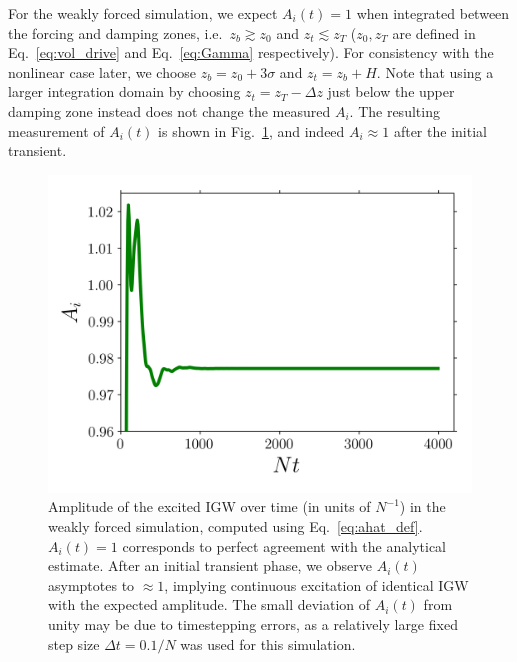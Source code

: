 \documentclass[
        fleqn,
        usenatbib,
    ]{mnras}
\begin{document}
For the weakly forced simulation, we expect
$A_i(t) = 1$ when integrated between the forcing and damping zones, i.e.\
$z_b \gtrsim z_0$ and $z_t \lesssim z_T$ ($z_0, z_T$ are defined in
Eq.~\eqref{eq:vol_drive} and Eq.~\eqref{eq:Gamma} respectively). For consistency
with the nonlinear case later, we choose $z_b = z_0 + 3\sigma$ and $z_t = z_b +
H$. Note that using a larger integration domain by choosing $z_t = z_T - \Delta
z$ just below the upper damping zone instead does not change the measured $A_i$.
The resulting measurement of $A_i(t)$ is shown in Fig.~\ref{fig:lin_amps}, and
indeed $A_i \approx 1$ after the initial transient.
\begin{figure}
    \centering
    \includegraphics[width=0.9\columnwidth]{plots/lin_amps.png}
    \caption{Amplitude of the excited IGW over time (in units of $N^{-1}$) in
    the weakly forced simulation, computed using Eq.~\eqref{eq:ahat_def}.
    $A_i(t) = 1$ corresponds to perfect agreement with the analytical estimate.
    After an initial transient phase, we observe $A_i(t)$ asymptotes to $\approx
    1$, implying continuous excitation of identical IGW with the expected
    amplitude. The small deviation of $A_i(t)$ from unity may be due to
    timestepping errors, as a relatively large fixed step size $\Delta t =
    0.1/N$ was used for this simulation.}\label{fig:lin_amps}
\end{figure}
\end{document}
